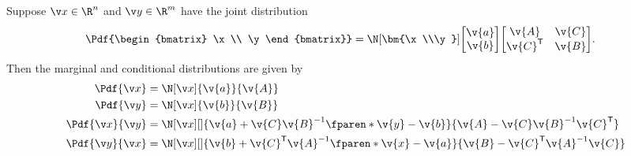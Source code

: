 \begin{lemma} \label{lemma:gaussian_cond}
Suppose $\x\in\R^n$ and $\y\in\R^m$ have the joint distribution
\begin{align*}
	\Pdf{\begin{bmatrix}
		\x\\
		\y
	\end{bmatrix}}&=
	\N[\bm{\x\\\y}]{
	\begin{bmatrix}
		\v{a}\\
		\v{b}
	\end{bmatrix}
	}{
	\begin{bmatrix}
		\v{A}&\v{C}\\
		\v{C}^\tr&\v{B}
	\end{bmatrix}
	}.
\end{align*}
Then the marginal and conditional distributions are given by
\begin{align*}
	\Pdf{\x} &= \N[\x]{\v{a}}{\v{A}}\\
	\Pdf{\y} &= \N[\x]{\v{b}}{\v{B}}\\
	\Pdf{\x}{\y}&= \N[\x][\displaystyle]{\v{a}+\v{C}\v{B}^{-1}\fparen*{\v{y}-\v{b}}}{\v{A}-\v{C}\v{B}^{-1}\v{C}^\tr}\\
	\Pdf{\y}{\x}&= \N[\x][\displaystyle]{\v{b}+\v{C}^\tr\v{A}^{-1}\fparen*{\v{x}-\v{a}}}{\v{B}-\v{C}^\tr\v{A}^{-1}\v{C}}
\end{align*}
\end{lemma}
